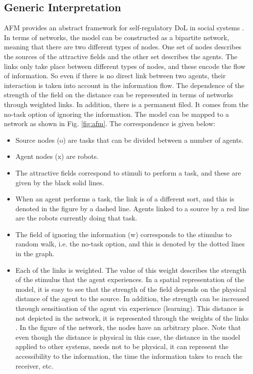 \documentclass{llncs}
\begin{document}
\subsection{Generic Interpretation}
AFM provides an abstract framework for self-regulatory DoL in social systems \cite{Elsa}. In terms of networks, the model can be constructed as a bipartite network, meaning that there are two different types of nodes. One set of nodes describes the sources of the attractive fields and the other set describes the agents. The links only take place between different types of nodes, and these encode the flow of information. So even if there is no direct link between two agents, their interaction is taken into account in the information flow. The dependence of the strength of the field on the distance can be represented in terms of networks through weighted links. In addition, there is a permanent filed. It comes from the no-task option of ignoring the information. The model can be mapped to a network as shown in Fig. \ref{fig:afm}. The correspondence is given below:
\begin{itemize}
\item Source nodes (o) are tasks that can be divided between a number of agents.
\item Agent nodes (x) are robots.
\item The attractive fields correspond to stimuli to perform a task, and these are given by the black solid lines.
\item When an agent performs a task, the link is of a different sort, and this is denoted in the figure by a dashed line. Agents linked to a source by a red line are the robots currently doing that task. 
\item The field of ignoring the information (w) corresponds to the stimulus to random walk, i.e. the no-task option, and this is denoted by the dotted lines in the graph. 
\item Each of the links is weighted. The value of this weight describes the strength of the stimulus that the agent experiences. In a spatial representation of the model, it is easy to see that the strength of the field depends on the physical distance of the agent to the source. In addition, the strength can be increased through sensitisation of the agent via experience (learning). This distance is not depicted in the network, it is represented through the weights of the links . In the figure of the network, the nodes have an arbitrary place. Note that even though the distance is physical in this case, the distance in the model applied to other systems, needs not to be physical, it can represent the accessibility to the information, the time the information takes to reach the receiver, etc. 
\end{itemize}
\end{document}
